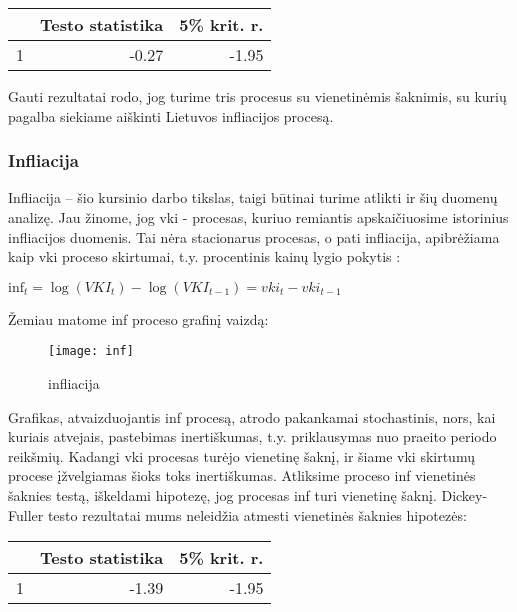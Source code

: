 \documentclass[a4paper]{article}
\begin{document}
\begin{table}[!h]
\begin{center}
\begin{tabular}{rrr}
  \hline
 & Testo statistika & 5\% krit. r. \\ 
  \hline
1 & -0.27 & -1.95 \\ 
   \hline
\end{tabular}
\end{center}
\end{table}

\noindent Gauti rezultatai rodo, jog turime tris procesus su vienetinėmis šaknimis, su kurių pagalba siekiame aiškinti Lietuvos infliacijos procesą.

\newpage \subsubsection{Infliacija} 

Infliacija – šio kursinio darbo tikslas, taigi būtinai turime atlikti ir šių duomenų analizę. Jau žinome, jog vki - procesas, kuriuo remiantis apskaičiuosime istorinius infliacijos duomenis. Tai nėra stacionarus procesas, o pati infliacija, apibrėžiama  kaip vki proceso skirtumai, t.y. procentinis kainų lygio pokytis :

\begin{table}[!h]
\centering
$\text{inf}_t = \log(VKI_t) - \log(VKI_{t-1}) = vki_t - vki_{t-1}$
\caption{}
\end{table}

\noindent Žemiau matome inf proceso grafinį vaizdą:

\begin{figure}[!h]
\centering
\texttt{[image: inf]}
\caption{infliacija}
\end{figure}

\noindent Grafikas, atvaizduojantis inf procesą, atrodo pakankamai stochastinis, nors, kai kuriais atvejais, pastebimas inertiškumas, t.y. priklausymas nuo praeito periodo reikšmių. Kadangi vki procesas turėjo vienetinę šaknį, ir šiame vki skirtumų procese įžvelgiamas šioks toks inertiškumas. Atliksime proceso inf vienetinės šaknies testą, iškeldami hipotezę, jog procesas inf turi vienetinę šaknį. Dickey-Fuller testo rezultatai mums neleidžia atmesti vienetinės šaknies hipotezės:

\begin{table}[!h]
\begin{center}
\begin{tabular}{rrr}
  \hline
 & Testo statistika & 5\% krit. r. \\ 
  \hline
1 & -1.39 & -1.95 \\ 
   \hline
\end{tabular}
\end{center}
\end{table}
\end{document}
